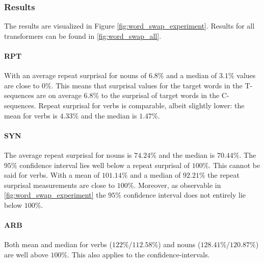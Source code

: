 \subsubsection{Results}\label{ex:2_word_swap_results}

The results are visualized in Figure \ref{fig:word_swap_experiment}. Results for all transformers can be found in \ref{fig:word_swap_all}.

\paragraph{RPT}
With an average repeat surprisal for nouns of $6.8\%$ and a median of $3.1\%$ values are close to $0\%$. This means that surprisal values for the target words in the T-sequences are on average $6.8\%$ to the surprisal of target words in the C-sequences. Repeat surprisal for verbs is comparable, albeit slightly lower: the mean for verbs is $4.33\%$ and the median is $1.47\%$.

\paragraph{SYN}
The average repeat surprisal for nouns is $74.24\%$ and the median is $70.44\%$. The $95\%$ confidence interval lies well below a repeat surprisal of $100\%$. This cannot be said for verbs. With a mean of $101.14\%$ and a median of $92.21\%$ the repeat surprisal measurements are close to $100\%$. Moreover, as observable in \ref{fig:word_swap_experiment} the  $95\%$ confidence interval does not entirely lie below $100\%$.

\paragraph{ARB}
Both mean and median for verbs ($122\%$/$112.58\%$) and nouns ($128.41\%$/$120.87\%$) are well above $100\%$. This also applies to the confidence-intervals.


